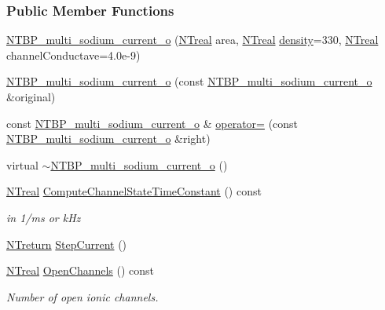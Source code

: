 \subsubsection*{Public Member Functions}
\begin{DoxyCompactItemize}
\item 
\hyperlink{class_n_t_b_p__multi__sodium__current__o_ab42e9312200e7f9754a0de64f9e94483}{NTBP\_\-multi\_\-sodium\_\-current\_\-o} (\hyperlink{nt__types_8h_a814a97893e9deb1eedcc7604529ba80d}{NTreal} area, \hyperlink{nt__types_8h_a814a97893e9deb1eedcc7604529ba80d}{NTreal} \hyperlink{class_n_t_b_p__multi__current__o_a82138baaa276b09c13038ca1fd6f08a7}{density}=330, \hyperlink{nt__types_8h_a814a97893e9deb1eedcc7604529ba80d}{NTreal} channelConductave=4.0e-\/9)
\item 
\hyperlink{class_n_t_b_p__multi__sodium__current__o_ab7787d12a6f33a07134ba83e8d8e04c4}{NTBP\_\-multi\_\-sodium\_\-current\_\-o} (const \hyperlink{class_n_t_b_p__multi__sodium__current__o}{NTBP\_\-multi\_\-sodium\_\-current\_\-o} \&original)
\item 
const \hyperlink{class_n_t_b_p__multi__sodium__current__o}{NTBP\_\-multi\_\-sodium\_\-current\_\-o} \& \hyperlink{class_n_t_b_p__multi__sodium__current__o_a5f96a821ae325dce8fdffcdbb1708a12}{operator=} (const \hyperlink{class_n_t_b_p__multi__sodium__current__o}{NTBP\_\-multi\_\-sodium\_\-current\_\-o} \&right)
\item 
virtual \hyperlink{class_n_t_b_p__multi__sodium__current__o_aa48b7e1d413bfc8f1aad01c93607df9c}{$\sim$NTBP\_\-multi\_\-sodium\_\-current\_\-o} ()
\item 
\hyperlink{nt__types_8h_a814a97893e9deb1eedcc7604529ba80d}{NTreal} \hyperlink{class_n_t_b_p__multi__sodium__current__o_a14e22985c2de51f5ec46b54391cd7545}{ComputeChannelStateTimeConstant} () const 
\begin{DoxyCompactList}\small\item\em in 1/ms or kHz \item\end{DoxyCompactList}\item 
\hyperlink{nt__types_8h_ab9564ee8f091e809d21b8451c6683c53}{NTreturn} \hyperlink{class_n_t_b_p__multi__sodium__current__o_a12f701c06fc1914388a052529ce1d291}{StepCurrent} ()
\item 
\hyperlink{nt__types_8h_a814a97893e9deb1eedcc7604529ba80d}{NTreal} \hyperlink{class_n_t_b_p__multi__sodium__current__o_ad2e2280b8798305ee63a8c2b3ac98007}{OpenChannels} () const 
\begin{DoxyCompactList}\small\item\em Number of open ionic channels. \item\end{DoxyCompactList}\item 

\end{DoxyCompactItemize}
